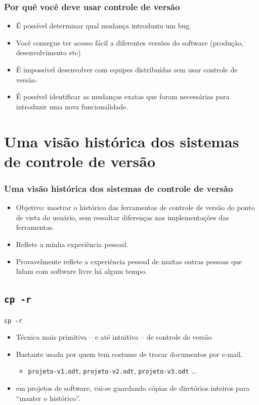 \documentclass{beamer}
\newcommand{\cpr}{\texttt{cp -r}}
\begin{document}
\begin{frame}
  \frametitle{Por quê você deve usar controle de versão}
  
  \begin{itemize}
      \pause
    \item É possível determinar qual mudança introduziu um bug.
      \pause
    \item Você consegue ter acesso fácil a diferentes versões do software (produção,
      desenvolvimento etc)
      \pause
    \item É impossível desenvolver com equipes distribuídas sem usar
      controle de versão.
      \pause
    \item É possível identificar as mudanças exatas que foram necessárias
      para introduzir uma nova funcionalidade.
  \end{itemize}
\end{frame}

\section[Histórico]{Uma visão histórica dos sistemas de controle de versão}

\begin{frame}
  \frametitle{Uma visão histórica dos sistemas de controle de versão}

  \pause
  \begin{itemize}
    \item Objetivo: mostrar o histórico das ferramentas de controle de
      versão do ponto de vista do usuário, sem ressaltar diferenças nas
      implementações das ferramentas.
      \pause
    \item Reflete a minha experiência pessoal.
      \pause
    \item Provavelmente reflete a experiência pessoal de muitas outras
      pessoas que lidam com software livre há algum tempo.
  \end{itemize}
\end{frame}

\subsection{\cpr}

\begin{frame}{\cpr}
  \begin{itemize}
    \item Técnica mais primitiva -- e até intuitiva -- de controle de versão
    \item Bastante usada por quem tem costume de trocar documentos por
      e-mail.
      \begin{itemize}
        \item \texttt{projeto-v1.odt}, \texttt{projeto-v2.odt},
          \texttt{projeto-v3.odt} \ldots
      \end{itemize}
    \item em projetos de software, vai-se guardando cópias de diretórios
      inteiros para ``manter o histórico''.
  \end{itemize}
\end{frame}
\end{document}
